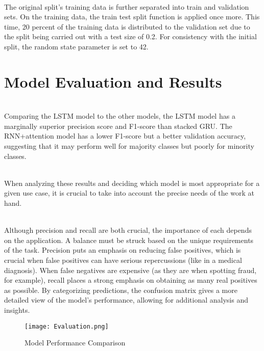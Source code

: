 \documentclass[conference]{IEEEtran}
\begin{document}
\\ The original split's training data is further separated into train and validation sets. On the training data, the train test split function is applied once more. This time, 20 percent of the training data is distributed to the validation set due to the split being carried out with a test size of 0.2. For consistency with the initial split, the random state parameter is set to 42.

\section{Model Evaluation and Results}
\\ Comparing the LSTM model to the other models, the LSTM model has a marginally superior precision score and F1-score than stacked GRU.
The RNN+attention model has a lower F1-score but a better validation accuracy, suggesting that it may perform well for majority classes but poorly for minority classes. 

\\ When analyzing these results and deciding which model is most appropriate for a given use case, it is crucial to take into account the precise needs of the work at hand.

\\ Although precision and recall are both crucial, the importance of each depends on the application. A balance must be struck based on the unique requirements of the task.
Precision puts an emphasis on reducing false positives, which is crucial when false positives can have serious repercussions (like in a medical diagnosis).
When false negatives are expensive (as they are when spotting fraud, for example), recall places a strong emphasis on obtaining as many real positives as possible.
By categorizing predictions, the confusion matrix gives a more detailed view of the model's performance, allowing for additional analysis and insights.
\begin{figure}[htbp]
\centerline{\texttt{[image: Evaluation.png]}}
\caption{Model Performance Comparison}
\label{fig}
\end{figure}

\\ 
\end{document}
